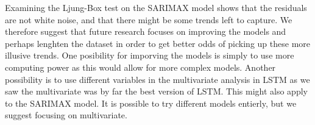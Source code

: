 Examining the Ljung-Box test on the SARIMAX model shows that the residuals are not white noise, and that there might be some trends left to capture. We therefore suggest that future research focuses on improving the models and perhaps lenghten the dataset in order to get better odds of picking up these more illusive trends. One posibility for imporving the models is simply to use more computing power as this would allow for more complex models. Another possibility is to use different variables in the multivariate analysis in LSTM as we saw the multivariate was by far the best version of LSTM. This might also apply to the SARIMAX model. It is possible to try different models entierly, but we suggest focusing on multivariate.
